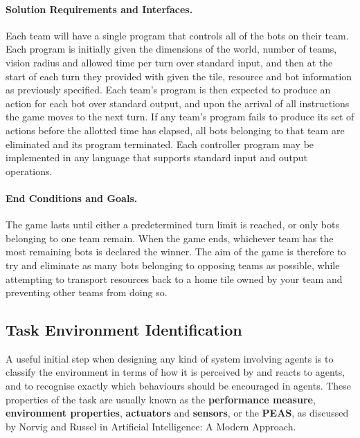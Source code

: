 \documentclass[a4paper,10pt]{article}
\begin{document}
\paragraph{Solution Requirements and Interfaces.}
Each team will have a single program that controls all of the bots on their team. Each program is initially given the dimensions of the world, number of teams, vision radius and allowed time per turn over standard input, and then at the start of each turn they provided with given the tile, resource and bot information as previously specified. Each team's program is then expected to produce an action for each bot over standard output, and upon the arrival of all instructions the game moves to the next turn. If any team's program fails to produce its set of actions before the allotted time has elapsed, all bots belonging to that team are eliminated and its program terminated. Each controller program may be implemented in any language that supports standard input and output operations.

\paragraph{End Conditions and Goals.}
The game lasts until either a predetermined turn limit is reached, or only bots belonging to one team remain. When the game ends, whichever team has the most remaining bots is declared the winner. The aim of the game is therefore to try and eliminate as many bots belonging to opposing teams as possible, while attempting to transport resources back to a home tile owned by your team and preventing other teams from doing so.

\subsection{Task Environment Identification}
A useful initial step when designing any kind of system involving agents is to classify the environment in terms of how it is perceived by and reacts to agents, and to recognise exactly which behaviours should be encouraged in agents. These properties of the task are usually known as the \textbf{performance measure}, \textbf{environment properties}, \textbf{actuators} and \textbf{sensors}, or the \textbf{PEAS}, as discussed by Norvig and Russel in Artificial Intelligence: A Modern Approach\cite{norvig10}.
\end{document}
